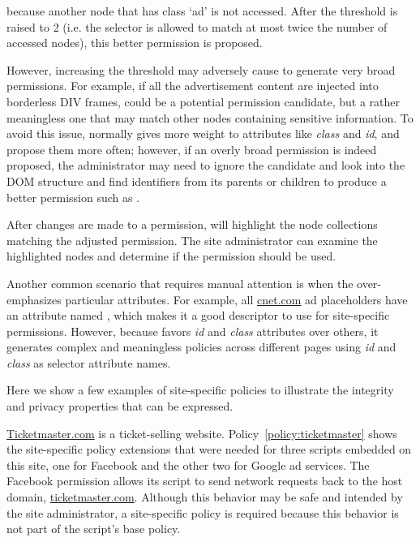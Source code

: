 \begin{algorithmic}[1]
	\Statex {}\par
\end{algorithmic}
\noindent
because another node that has class `ad' is not accessed.  After the
threshold is raised to 2 (i.e. the selector is allowed to match at most twice the number of accessed nodes), this better permission is proposed. 

However, increasing the threshold may adversely cause \pg to generate
very broad permissions.  For example, if all the advertisement content are injected into borderless DIV frames,  could be a potential permission candidate, but a rather meaningless one that may match other nodes containing sensitive information.
To avoid this issue, \pg normally gives more weight to attributes like \emph{class} and \emph{id}, and propose them more often; however, if an overly broad permission is indeed proposed, the administrator may need to ignore the candidate and look into the DOM structure and find
identifiers from its parents or children to produce a better permission
such as .

After changes are made to a permission, \vis will highlight the node
collections matching the adjusted permission.  The site administrator
can examine the highlighted nodes and determine if the permission should be used.

Another common scenario that requires manual attention is when the \pg
over-emphasizes particular attributes.  For example, all \url{cnet.com}
ad placeholders have an attribute named , which makes it a
good descriptor to use for site-specific permissions.  However, because
\pg favors \emph{id} and \emph{class} attributes over others, it
generates complex and meaningless policies across different pages using
\emph{id} and \emph{class} as selector attribute names.

 Here we show a few examples
of site-specific policies to illustrate the integrity and privacy
properties that can be expressed.

\url{Ticketmaster.com} is a ticket-selling website.
Policy~\ref{policy:ticketmaster} shows the site-specific policy
extensions that were needed for three scripts embedded on this site, one
for Facebook and the other two for Google ad services.  The Facebook
permission allows its script to send network requests back to the host
domain, \url{ticketmaster.com}.  Although this behavior may be safe and
intended by the site administrator, a site-specific policy is required
because this behavior is not part of the script's base policy.

